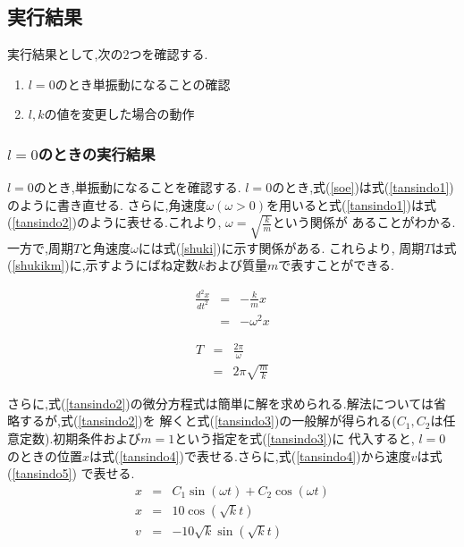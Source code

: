 \documentclass[a4j]{jarticle}
\begin{document}
      \subsection{実行結果}
      実行結果として,次の2つを確認する.
      \begin{enumerate}
        \item $l=0$のとき単振動になることの確認
        \item $l,k$の値を変更した場合の動作
      \end{enumerate}  

      \subsubsection{$l=0$のときの実行結果}
      $l=0$のとき,単振動になることを確認する. $l=0$のとき,式(\ref{soe})は式(\ref{tansindo1})のように書き直せる.
      さらに,角速度$\omega(\omega >0)$を用いると式(\ref{tansindo1})は式(\ref{tansindo2})のように表せる.これより, $\omega=\sqrt{\frac{k}{m}}$という関係が
      あることがわかる.一方で,周期$T$と角速度$\omega$には式(\ref{shuki})に示す関係がある. これらより,
      周期$T$は式(\ref{shukikm})に,示すようにばね定数$k$および質量$m$で表すことができる.

      \begin{eqnarray}
        \frac{d^2x}{dt^2} &=& -\frac{k}{m}x \label{tansindo1} \\
        &=& -\omega^2 x \label{tansindo2} 
      \end{eqnarray}

      \begin{eqnarray}
        T &=& \frac{2 \pi }{\omega} \label{shuki} \\
         &=& 2\pi \sqrt{\frac{m}{k}} \label{shukikm}
      \end{eqnarray}

      さらに,式(\ref{tansindo2})の微分方程式は簡単に解を求められる.解法については省略するが,式(\ref{tansindo2})を
      解くと式(\ref{tansindo3})の一般解が得られる($C_1,C_2$は任意定数).初期条件および$m=1$という指定を式(\ref{tansindo3})に
      代入すると, $l=0$のときの位置$x$は式(\ref{tansindo4})で表せる.さらに,式(\ref{tansindo4})から速度$v$は式(\ref{tansindo5})
      で表せる.
      \begin{eqnarray}
        x &=& C_1 \sin(\omega t) + C_2 \cos(\omega t) \label{tansindo3} \\
        x &=& 10\cos(\sqrt{k} t) \label{tansindo4} \\
        v &=& -10\sqrt{k} \sin(\sqrt{k} t) \label{tansindo5}
      \end{eqnarray}
\end{document}
